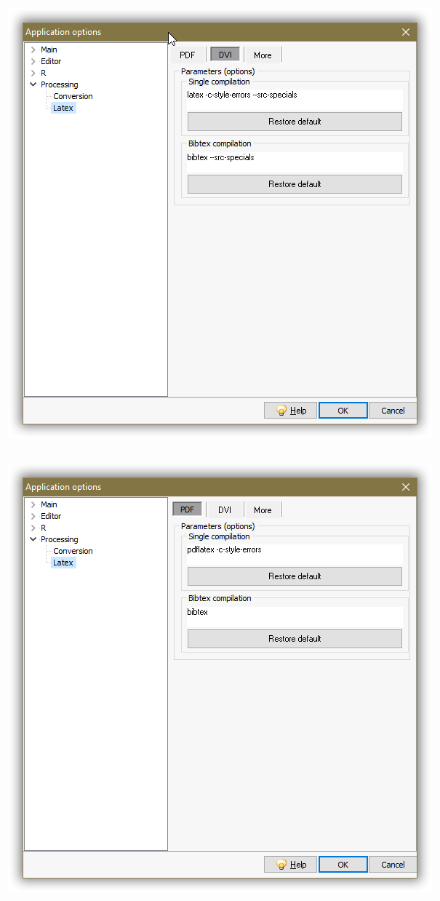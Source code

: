 \begin{figure}[h!]
  \includegraphics[scale=0.33]{./res/app_processing_latex_dvi.png}~~
  \includegraphics[scale=0.33]{./res/app_processing_latex_pdf.png}\\

\end{figure}

